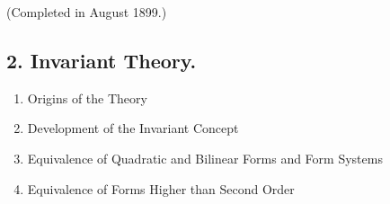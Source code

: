 \vspace{-0.1cm}
{\normalfont(Completed in August 1899.)}

\subsection*{\small2. Invariant Theory. }

\begin{enumerate}[itemsep=0pt]
    \item Origins of the Theory
    \item Development of the Invariant Concept
    \item Equivalence of Quadratic and Bilinear Forms and Form Systems
    \item Equivalence of Forms Higher than Second Order
\end{enumerate}

